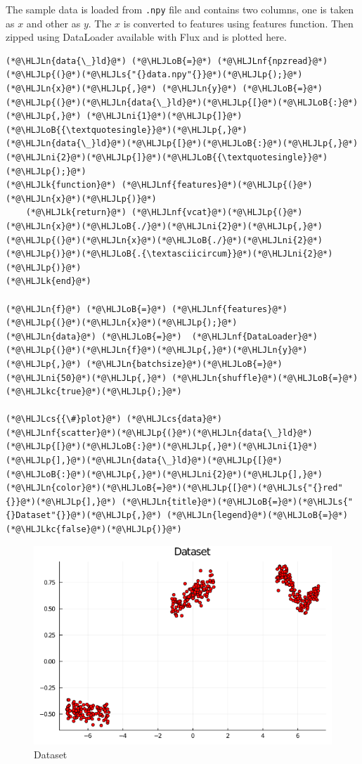 \documentclass[12pt,a4paper]{article}
\newcommand{\HLJLk}[1]{\textcolor[RGB]{148,91,176}{\textbf{#1}}}
\newcommand{\HLJLkc}[1]{\textcolor[RGB]{59,151,46}{\textit{#1}}}
\newcommand{\HLJLn}[1]{#1}
\newcommand{\HLJLnf}[1]{\textcolor[RGB]{66,102,213}{#1}}
\newcommand{\HLJLs}[1]{\textcolor[RGB]{201,61,57}{#1}}
\newcommand{\HLJLni}[1]{\textcolor[RGB]{59,151,46}{#1}}
\newcommand{\HLJLoB}[1]{\textcolor[RGB]{102,102,102}{\textbf{#1}}}
\newcommand{\HLJLp}[1]{#1}
\newcommand{\HLJLcs}[1]{\textcolor[RGB]{153,153,119}{\textit{#1}}}
\begin{document}
The sample data is loaded from \texttt{.npy} file and contains two columns, one is taken as $x$ and other as $y$. The $x$ is converted to features using features function. Then zipped using DataLoader available with Flux and is plotted here.


\begin{lstlisting}
(*@\HLJLn{data{\_}ld}@*) (*@\HLJLoB{=}@*) (*@\HLJLnf{npzread}@*)(*@\HLJLp{(}@*)(*@\HLJLs{"{}data.npy"{}}@*)(*@\HLJLp{);}@*)
(*@\HLJLn{x}@*)(*@\HLJLp{,}@*) (*@\HLJLn{y}@*) (*@\HLJLoB{=}@*) (*@\HLJLp{(}@*)(*@\HLJLn{data{\_}ld}@*)(*@\HLJLp{[}@*)(*@\HLJLoB{:}@*)(*@\HLJLp{,}@*) (*@\HLJLni{1}@*)(*@\HLJLp{]}@*)(*@\HLJLoB{{\textquotesingle}}@*)(*@\HLJLp{,}@*) (*@\HLJLn{data{\_}ld}@*)(*@\HLJLp{[}@*)(*@\HLJLoB{:}@*)(*@\HLJLp{,}@*) (*@\HLJLni{2}@*)(*@\HLJLp{]}@*)(*@\HLJLoB{{\textquotesingle}}@*)(*@\HLJLp{);}@*)
(*@\HLJLk{function}@*) (*@\HLJLnf{features}@*)(*@\HLJLp{(}@*)(*@\HLJLn{x}@*)(*@\HLJLp{)}@*)
    (*@\HLJLk{return}@*) (*@\HLJLnf{vcat}@*)(*@\HLJLp{(}@*)(*@\HLJLn{x}@*)(*@\HLJLoB{./}@*)(*@\HLJLni{2}@*)(*@\HLJLp{,}@*) (*@\HLJLp{(}@*)(*@\HLJLn{x}@*)(*@\HLJLoB{./}@*)(*@\HLJLni{2}@*)(*@\HLJLp{)}@*)(*@\HLJLoB{.{\textasciicircum}}@*)(*@\HLJLni{2}@*)(*@\HLJLp{)}@*)
(*@\HLJLk{end}@*)

(*@\HLJLn{f}@*) (*@\HLJLoB{=}@*) (*@\HLJLnf{features}@*)(*@\HLJLp{(}@*)(*@\HLJLn{x}@*)(*@\HLJLp{);}@*)
(*@\HLJLn{data}@*) (*@\HLJLoB{=}@*)  (*@\HLJLnf{DataLoader}@*)(*@\HLJLp{(}@*)(*@\HLJLn{f}@*)(*@\HLJLp{,}@*)(*@\HLJLn{y}@*)(*@\HLJLp{,}@*) (*@\HLJLn{batchsize}@*)(*@\HLJLoB{=}@*)(*@\HLJLni{50}@*)(*@\HLJLp{,}@*) (*@\HLJLn{shuffle}@*)(*@\HLJLoB{=}@*)(*@\HLJLkc{true}@*)(*@\HLJLp{);}@*)

(*@\HLJLcs{{\#}plot}@*) (*@\HLJLcs{data}@*)
(*@\HLJLnf{scatter}@*)(*@\HLJLp{(}@*)(*@\HLJLn{data{\_}ld}@*)(*@\HLJLp{[}@*)(*@\HLJLoB{:}@*)(*@\HLJLp{,}@*)(*@\HLJLni{1}@*)(*@\HLJLp{],}@*)(*@\HLJLn{data{\_}ld}@*)(*@\HLJLp{[}@*)(*@\HLJLoB{:}@*)(*@\HLJLp{,}@*)(*@\HLJLni{2}@*)(*@\HLJLp{],}@*)(*@\HLJLn{color}@*)(*@\HLJLoB{=}@*)(*@\HLJLp{[}@*)(*@\HLJLs{"{}red"{}}@*)(*@\HLJLp{],}@*) (*@\HLJLn{title}@*)(*@\HLJLoB{=}@*)(*@\HLJLs{"{}Dataset"{}}@*)(*@\HLJLp{,}@*) (*@\HLJLn{legend}@*)(*@\HLJLoB{=}@*)(*@\HLJLkc{false}@*)(*@\HLJLp{)}@*)
\end{lstlisting}

\begin{figure}
\centering
\includegraphics{img/data_set.png}
\caption{Dataset}
\end{figure}
\end{document}
